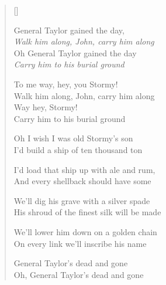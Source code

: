 \pagebreak
\settowidth{\versewidth}{We'll dig his grave with a silver spade}
\begin{verse}[\versewidth]
\begin{patverse}
General Taylor gained the day,\\
\textit{Walk him along, John, carry him along}\\
Oh General Taylor gained the day\\
\textit{Carry him to his burial ground}
\end{patverse}

\begin{patverse}
\begin{chorus}
To me way, hey, you Stormy!\\
Walk him along, John, carry him along\\
Way hey, Stormy!\\
Carry him to his burial ground
\end{chorus}
\end{patverse}

Oh I wish I was old Stormy's son\\
I'd build a ship of ten thousand ton

I'd load that ship up with ale and rum,\\
And every shellback should have some

We'll dig his grave with a silver spade\\
His shroud of the finest silk will be made

We'll lower him down on a golden chain\\
On every link we'll inscribe his name

General Taylor's dead and gone\\
Oh, General Taylor's dead and gone

\end{verse}
